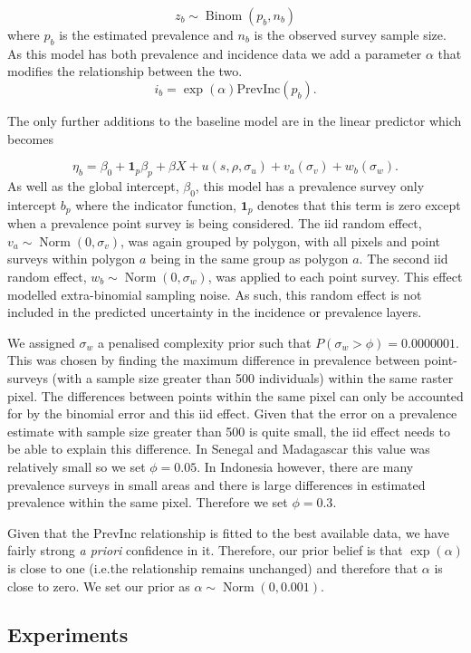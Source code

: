 \documentclass{statsoc}
\begin{document}
$$z_b \sim \operatorname{Binom}(p_b, n_b) $$
where $p_b$ is the estimated prevalence and $n_b$ is the observed survey sample size. 
As this model has both prevalence and incidence data we add a parameter $\alpha$ that modifies the relationship between the two.
$$i_b = \exp(\alpha)\mathrm{PrevInc}(p_b).$$

The only further additions to the baseline model are in the linear predictor which becomes 

$$\eta_b = \beta_0 + \mathbf{1}_p\beta_p +  \beta X  + u(s, \rho, \sigma_u) + v_a(\sigma_v) + w_b(\sigma_w).$$
As well as the global intercept, $\beta_0$, this model has a prevalence survey only intercept $b_p$ where the indicator function, $\mathbf{1}_p$ denotes that this term is zero except when a prevalence point survey is being considered.
The iid random effect, $v_a \sim \operatorname{Norm}(0, \sigma_v)$, was again grouped by polygon, with all pixels and point surveys within polygon $a$ being in the same group as polygon $a$.
The second iid random effect, $w_b \sim \operatorname{Norm}(0, \sigma_w)$, was applied to each point survey.
This effect modelled extra-binomial sampling noise.
As such, this random effect is not included in the predicted uncertainty in the incidence or prevalence layers.

We assigned $\sigma_w$ a penalised complexity prior such that $P(\sigma_w > \phi) = 0.0000001$. 
This was chosen by finding the maximum difference in prevalence between point-surveys (with a sample size greater than 500 individuals) within the same raster pixel.
The differences between points within the same pixel can only be accounted for by the binomial error and this iid effect.
Given that the error on a prevalence estimate with sample size greater than 500 is quite small, the iid effect needs to be able to explain this difference.
In Senegal and Madagascar this value was relatively small so we set $\phi = 0.05$. 
In Indonesia however, there are many prevalence surveys in small areas and there is large differences in estimated prevalence within the same pixel.
Therefore we set $\phi = 0.3$.

Given that the PrevInc relationship is fitted to the best available data, we have fairly strong \emph{a priori} confidence in it.
Therefore, our prior belief is that $\exp(\alpha)$ is close to one (i.e.\thinspace the relationship remains unchanged) and therefore that $\alpha$ is close to zero.
We set our prior as $\alpha \sim \operatorname{Norm}(0, 0.001)$.


\subsection*{Experiments}
\end{document}
